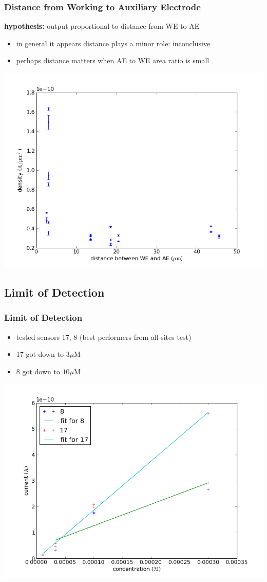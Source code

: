 \documentclass[10pt]{beamer}
\begin{document}
\begin{frame}
	\frametitle{Distance from Working to Auxiliary Electrode}
	\textbf{hypothesis:} output proportional to distance from WE to AE
	\begin{itemize}
		\item in general it appears distance plays a minor role: inconclusive
		\item perhaps distance matters when AE to WE area ratio is small
	\end{itemize}
	\includegraphics[width=0.8\linewidth]{figures/distance_v_density.png}
\end{frame}

\subsection{Limit of Detection}
\begin{frame}
	\frametitle{Limit of Detection}
	\begin{itemize}
		\item tested sensors 17, 8 (best performers from all-sites test)
		\item 17 got down to $3 \mu \mathrm{M}$
		\item 8 got down to $10 \mu \mathrm{M}$
	\end{itemize}
	\includegraphics[width=0.8\linewidth]{figures/limit.png}
\end{frame}
\end{document}
